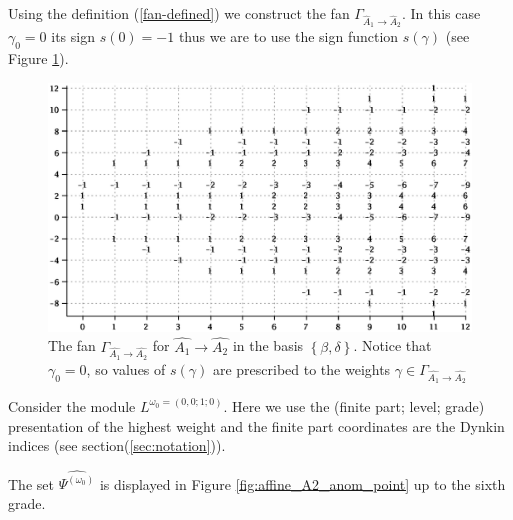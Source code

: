 \documentclass[12pt]{iopart}
\theoremstyle{definition}
\begin{document}
Using the definition (\ref{fan-defined})  we construct the fan $\Gamma_{\hat A_1\to\hat A_2}$.
In this case $\gamma_0 =0$ its sign $s\left( 0 \right)=-1$ thus we are to use the
sign function $s(\gamma)$ (see Figure \ref{fig:AffineA2A1Fan}).


\begin{figure}[h!bt]
  \centering
  \includegraphics[width=125mm]{figure6.eps}

  \caption{The fan $\Gamma_{\hat{A_1}\rightarrow \hat{A_2}}$ for $\hat{A_1}\rightarrow \hat{A_2}$
  in the basis $\left\{\beta,\delta \right\}$. Notice that $\gamma_0 =0$, so values of $s(\gamma)$
  are prescribed to the weights $\gamma\in \Gamma_{\hat{A_1}\rightarrow \hat{A_2}}$}
  \label{fig:AffineA2A1Fan}
\end{figure}

Consider the module $L^{\omega_0=(0,0;1;0)}$. Here we use the (finite part; level; grade)
presentation of the highest weight and the finite part
coordinates are the Dynkin indices (see section(\ref{sec:notation})).

The set $\widehat{\Psi^{(\omega_0)}}$  is displayed in Figure
\ref{fig:affine_A2_anom_point} up to the sixth grade.
\end{document}
